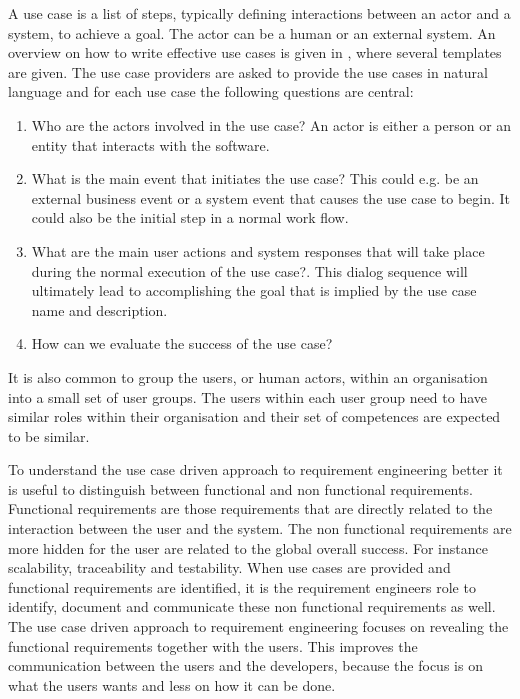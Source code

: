 \documentclass[11pt, oneside]{article}   	%
\begin{document}
A use case is a list of steps, typically defining interactions between an actor and a system, to achieve a goal. The actor can be a human or an external system.  An overview on how to write effective use cases is given in \cite{Coc01}, where several templates are given. The use case providers are asked to provide the use cases in natural language and for each use case the following questions are central:

\begin{enumerate}
\item Who are the actors involved in the use case? An actor is either a person or an entity that interacts with the software.  
\item What is the main event that initiates the use case? This could e.g. be an external business event or a system event that causes the use case to begin.  It could also be the initial step in a normal work flow. 
\item What are the main user actions and system responses that will take place during the normal execution of the use case?. This dialog sequence will ultimately lead to accomplishing the goal that is implied by the use case name and description.
\item How can we evaluate the success of the use case?
\end{enumerate}
 
It is also common to group the users, or human actors, within an organisation into a small set of user groups. The users within each user group need to have similar roles within their organisation and their set of competences are expected to be similar. 

To understand the use case driven approach to requirement engineering better it is useful to distinguish between functional and non functional requirements.  Functional requirements are those requirements that are directly related to the interaction between the user and the system.  The non functional requirements are more hidden for the user are related to the global overall success.  For instance scalability, traceability and testability.  When use cases are provided and functional requirements are identified, it is the requirement engineers role to identify, document and communicate these non functional requirements as well.  The use case driven approach to requirement engineering focuses on revealing the functional requirements together with the users.  This improves the communication between the users and the developers, because the focus is on what the users wants and less on how it can be done.
\end{document}
